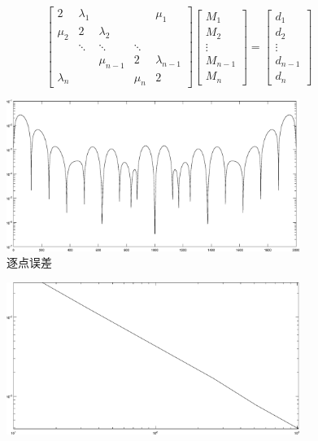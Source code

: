 \documentclass[12pt,a4paper,utf8]{ctexart}
\begin{document}
\begin{enumerate}
$$		\left[\begin{array}{ccccc}
			2 & \lambda_{1} & & & \mu_{1} \\
			\mu_{2} & 2 & \lambda_{2} & & \\
			& \ddots & \ddots & \ddots & \\
			& & \mu_{n-1} & 2 & \lambda_{n-1} \\
			\lambda_{n} & & & \mu_{n} & 2
		\end{array}\right]\left[\begin{array}{c}
			M_{1} \\
			M_{2} \\
			\vdots \\
			M_{n-1} \\
			M_{n}
		\end{array}\right]=\left[\begin{array}{c}
			d_{1} \\
			d_{2} \\
			\vdots \\
			d_{n-1} \\
			d_{n}
		\end{array}\right]$$
		\begin{figure}[H]
			\centering
			\includegraphics[width=0.85\textwidth]{1semilogy2}
			\caption{逐点误差}  
			\label{3}  
		\end{figure} 
		\begin{figure}[H]
			\centering
			\includegraphics[width=0.85\textwidth]{1loglog2}

\end{figure}
\end{enumerate}
\end{document}
